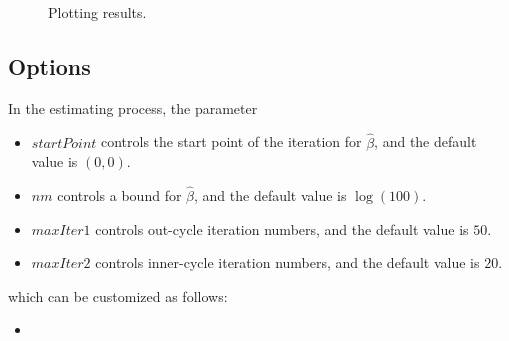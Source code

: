 \documentclass[12pt]{article}
\newcommand{\insertcode}[2]{\begin{itemize}\item[]\end{itemize}} %
\begin{document}
\begin{figure}[H]
\caption{Plotting results.}
\label{fig:plot1}
\end{figure}

\subsection{Options}\label{estimiating.confidentialbeta}
In the estimating process, the parameter
\begin{itemize}
  \item $startPoint$ controls the start point of the iteration for $\hat{\beta}$, and the default value is $(0,0)$.
  \item $nm$ controls a bound for $\hat{\beta}$, and the default value is $\log(100)$.
  \item $maxIter1$ controls out-cycle iteration numbers, and the default value is $50$.
  \item $maxIter2$ controls inner-cycle iteration numbers, and the default value is $20$.
\end{itemize}
which can be customized as follows:
\insertcode{"Scripts/code6.pl"}{Setting parameter $nm$ for estimator.}
\end{document}
